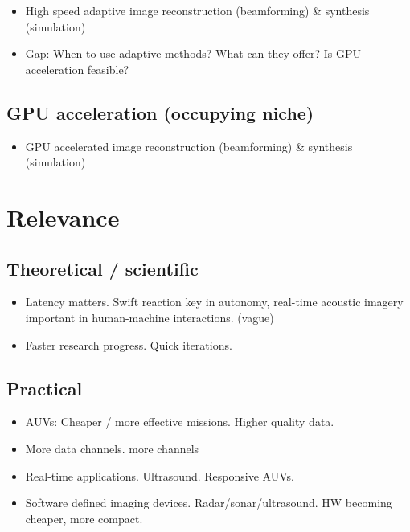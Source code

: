 {\begin{itemize}
\item High speed adaptive image reconstruction (beamforming) \& synthesis (simulation)
\item Gap: When to use adaptive methods? What can they offer? Is GPU acceleration feasible?
\end{itemize}

\subsection{GPU acceleration (occupying niche)}
\begin{itemize}
\item GPU accelerated image reconstruction (beamforming) \& synthesis (simulation)
\end{itemize}

\section{Relevance}

\subsection{Theoretical / scientific}
\begin{itemize}
\item Latency matters. Swift reaction key in autonomy, real-time acoustic imagery important in human-machine interactions. (vague)
\item Faster research progress. Quick iterations.
\end{itemize}

\subsection{Practical}

\begin{itemize}
\item AUVs: Cheaper / more effective missions. Higher quality data. 
\item More data channels. more channels
\item Real-time applications. Ultrasound. Responsive AUVs. 
\item Software defined imaging devices. Radar/sonar/ultrasound. HW becoming cheaper, more compact.
\end{itemize}


}
